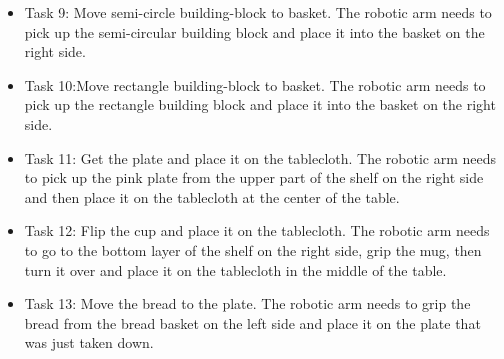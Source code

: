 \begin{itemize}
    \item Task 9: Move semi-circle building-block to basket. The robotic arm needs to pick up the semi-circular building block and place it into the basket on the right side. 
    \item Task 10:Move rectangle building-block to basket. The robotic arm needs to pick up the rectangle building block and place it into the basket on the right side. 
\end{itemize}


\begin{itemize}
    \item Task 11: Get the plate and place it on the tablecloth. The robotic arm needs to pick up the pink plate from the upper part of the shelf on the right side and then place it on the tablecloth at the center of the table.  
    \item Task 12: Flip the cup and place it on the tablecloth. The robotic arm needs to go to the bottom layer of the shelf on the right side, grip the mug, then turn it over and place it on the tablecloth in the middle of the table. 
    \item Task 13: Move the bread to the plate. The robotic arm needs to grip the bread from the bread basket on the left side and place it on the plate that was just taken down. 

\end{itemize}

